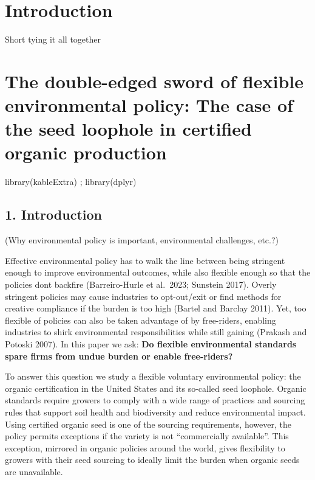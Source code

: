 \documentclass[twoside,12pt,final]{ucthesis-CA2012}
\newenvironment{Shaded}{}{}
\newcommand{\FunctionTok}[1]{\textcolor[rgb]{0.02,0.16,0.49}{{#1}}}
\newcommand{\NormalTok}[1]{{#1}}
\begin{document}
\begin{ucmainmatter}

\hypertarget{introduction}{%
\chapter*{Introduction}\label{introduction}}

Short tying it all together

\hypertarget{the-double-edged-sword-of-flexible-environmental-policy-the-case-of-the-seed-loophole-in-certified-organic-production}{%
\chapter{The double-edged sword of flexible environmental policy: The case of the seed loophole in certified organic production}\label{the-double-edged-sword-of-flexible-environmental-policy-the-case-of-the-seed-loophole-in-certified-organic-production}}

\begin{Shaded}
\begin{Highlighting}[]
 \FunctionTok{library}\NormalTok{(kableExtra) ; }\FunctionTok{library}\NormalTok{(dplyr) }
\end{Highlighting}
\end{Shaded}
\hypertarget{introduction-1}{%
\section{1. Introduction}\label{introduction-1}}

(Why environmental policy is important, environmental challenges, etc.?)

Effective environmental policy has to walk the line between being
stringent enough to improve environmental outcomes, while also flexible
enough so that the policies don\textquotesingle t backfire (Barreiro-Hurle et al.~2023;
Sunstein 2017). Overly stringent policies may cause industries to
opt-out/exit or find methods for creative compliance if the burden is
too high (Bartel and Barclay 2011). Yet, too flexible of policies can
also be taken advantage of by free-riders, enabling industries to shirk
environmental responsibilities while still gaining (Prakash and Potoski
2007). In this paper we ask: \textbf{Do flexible environmental standards spare
firms from undue burden or enable free-riders?}

To answer this question we study a flexible voluntary environmental
policy: the organic certification in the United States and its so-called
seed loophole. Organic standards require growers to comply with a wide
range of practices and sourcing rules that support soil health and
biodiversity and reduce environmental impact. Using certified organic
seed is one of the sourcing requirements, however, the policy permits
exceptions if the variety is not ``commercially available''. This
exception, mirrored in organic policies around the world, gives
flexibility to growers with their seed sourcing to ideally limit the
burden when organic seeds are unavailable.


\end{ucmainmatter}
\end{document}
